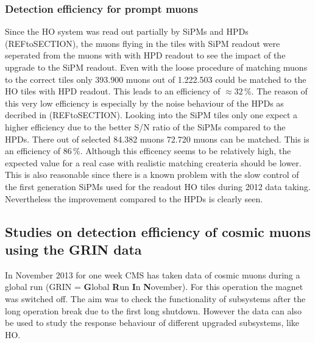 		\subsubsection{Detection efficiency for prompt muons}
			Since the HO system was read out partially by SiPMs and HPDs (REFtoSECTION), the muons flying in the tiles with SiPM readout were seperated from the muons with with HPD readout to see the impact of
			the upgrade to the SiPM readout.
			Even with the loose procedure of matching muons to the correct tiles only 393.900 muons out of 1.222.503 could be matched to the HO tiles with HPD readout.
			This leads to an efficiency of $\approx32\,\%$.
			The reason of this very low efficiency is especially by the noise behaviour of the HPDs as decribed in (REFtoSECTION).
			Looking into the SiPM tiles only one expect a higher efficiency due to the better S/N ratio of the SiPMs compared to the HPDs.
			There out of selected 84.382 muons 72.720 muons can be matched.
			This is an efficiency of $86\,\%$.
			Although this efficency seems to be relatively high, the expected value for a real case with realistic matching createria should be lower.
			This is also reasonable since there is a known problem with the slow control of the first generation SiPMs used for the readout HO tiles during 2012 data taking.
			Nevertheless the improvement compared to the HPDs is clearly seen.
	\subsection{Studies on detection efficiency of cosmic muons using the GRIN data} 
		In November 2013 for one week CMS has taken data of cosmic muons during a global run (GRIN = \textbf{G}lobal \textbf{R}un \textbf{I}n \textbf{N}ovember).
		For this operation the magnet was switched off.
		The aim was to check the functionality of subsystems after the long operation break due to the first long shutdown.
		However the data can also be used to study the response behaviour of different upgraded subsystems, like HO.
